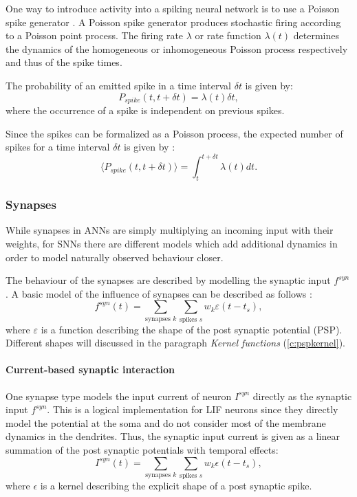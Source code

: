 One way to introduce activity into a spiking neural network is to use a Poisson spike generator \cite{Heeger2000}.
A Poisson spike generator produces stochastic firing according to a Poisson point process.
The firing rate $\lambda$ or rate function $\lambda(t)$ determines the dynamics of the homogeneous or inhomogeneous Poisson process respectively and thus of the spike times.   

The probability of an emitted spike in a time interval $\delta t$ is given by: 
\[
P_{spike}({t , t+ \delta t}) = \lambda(t) \delta t,
\]
where the occurrence of a spike is independent on previous spikes. 

Since the spikes can be formalized as a Poisson process, the expected number of spikes for a time interval $\delta t$ is given by :
\[
\langle  P_{spike}({t , t+ \delta t}) \rangle = \int_t^{t + \delta t} \lambda(t) dt.
\]


\subsubsection{Synapses} \label{c:synapses}

While synapses in ANNs are simply multiplying an incoming input with their weights, for SNNs there are different models which add additional dynamics in order to model naturally observed behaviour closer. 

The behaviour of the synapses are described by modelling the synaptic input $f^{syn}$. A basic model of the influence of synapses can be described as follows \cite{Petrovici2016}:
\[
f^{syn}(t) = \sum_{\text{synapses } k } \sum_{\text{spikes } s} w_k \varepsilon(t - t_s),
\]
where $\varepsilon$ is a function describing the shape of the post synaptic potential (PSP).
Different shapes will discussed in the paragraph \textit{Kernel functions} (\ref{c:pspkernel}).

\paragraph{Current-based synaptic interaction} \label{c:cuba}
One synapse type models the input current of neuron $I^{syn}$ directly as the synaptic input $f^{syn}$. This is a logical implementation for LIF neurons since they directly model the potential at the soma and do not consider most of the membrane dynamics in the dendrites. 
Thus, the synaptic input current is given as a linear summation of the post synaptic potentials with temporal effects:
\[
I^{syn}(t) = \sum_{\text{synapses } k } \sum_{\text{spikes } s} w_k \epsilon(t - t_s),
\]
where $\epsilon$ is a kernel describing the explicit shape of a post synaptic spike.

